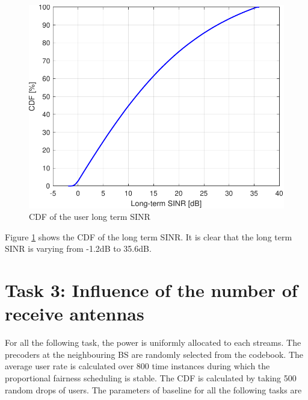\documentclass[10pt,conference]{IEEEtran}
\begin{document}
\begin{figure}[htb]
    \centering
    \includegraphics[width=1\linewidth]{Fig2.pdf}
    \caption{CDF of the user long term SINR}
    \label{fig2}
\end{figure}

Figure \ref{fig2} shows the CDF of the long term SINR. It is clear that the 
long term SINR is varying from -1.2dB to 35.6dB.

\section{Task 3: Influence of the number of receive antennas}
For all the following task, the power is uniformly allocated to each streams.
The precoders at the neighbouring BS are randomly selected from the codebook.
The average user rate is calculated over 800 time instances during which the proportional 
fairness scheduling is stable. The CDF is calculated by taking 500 random drops of users.
The parameters of baseline for all the following tasks are 
\end{document}
